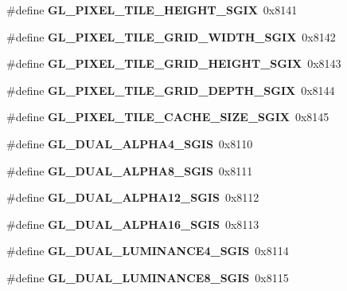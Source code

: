 \begin{DoxyCompactItemize}
\item 
\#define {\bfseries G\+L\+\_\+\+P\+I\+X\+E\+L\+\_\+\+T\+I\+L\+E\+\_\+\+H\+E\+I\+G\+H\+T\+\_\+\+S\+G\+I\+X}~0x8141\label{_s_d_l__opengl_8h_a1d4d01f0f5b2a302591bc7cd65da7f7f}

\item 
\#define {\bfseries G\+L\+\_\+\+P\+I\+X\+E\+L\+\_\+\+T\+I\+L\+E\+\_\+\+G\+R\+I\+D\+\_\+\+W\+I\+D\+T\+H\+\_\+\+S\+G\+I\+X}~0x8142\label{_s_d_l__opengl_8h_a966620eccb0139b2533f6ec094e22c11}

\item 
\#define {\bfseries G\+L\+\_\+\+P\+I\+X\+E\+L\+\_\+\+T\+I\+L\+E\+\_\+\+G\+R\+I\+D\+\_\+\+H\+E\+I\+G\+H\+T\+\_\+\+S\+G\+I\+X}~0x8143\label{_s_d_l__opengl_8h_aea9eb5632d5e562731dece8dda027c8f}

\item 
\#define {\bfseries G\+L\+\_\+\+P\+I\+X\+E\+L\+\_\+\+T\+I\+L\+E\+\_\+\+G\+R\+I\+D\+\_\+\+D\+E\+P\+T\+H\+\_\+\+S\+G\+I\+X}~0x8144\label{_s_d_l__opengl_8h_a31d3f2fd15ceb68a0a5bc84606d7b48a}

\item 
\#define {\bfseries G\+L\+\_\+\+P\+I\+X\+E\+L\+\_\+\+T\+I\+L\+E\+\_\+\+C\+A\+C\+H\+E\+\_\+\+S\+I\+Z\+E\+\_\+\+S\+G\+I\+X}~0x8145\label{_s_d_l__opengl_8h_acd930ab818187241acb60696083909ea}

\item 
\#define {\bfseries G\+L\+\_\+\+D\+U\+A\+L\+\_\+\+A\+L\+P\+H\+A4\+\_\+\+S\+G\+I\+S}~0x8110\label{_s_d_l__opengl_8h_a0fcac5085d66a0e2c27299067d656cf7}

\item 
\#define {\bfseries G\+L\+\_\+\+D\+U\+A\+L\+\_\+\+A\+L\+P\+H\+A8\+\_\+\+S\+G\+I\+S}~0x8111\label{_s_d_l__opengl_8h_ab1aa1dadda52fc595da940aa0bf1eb5d}

\item 
\#define {\bfseries G\+L\+\_\+\+D\+U\+A\+L\+\_\+\+A\+L\+P\+H\+A12\+\_\+\+S\+G\+I\+S}~0x8112\label{_s_d_l__opengl_8h_ae72536e212ead85a200058dd1b5fac52}

\item 
\#define {\bfseries G\+L\+\_\+\+D\+U\+A\+L\+\_\+\+A\+L\+P\+H\+A16\+\_\+\+S\+G\+I\+S}~0x8113\label{_s_d_l__opengl_8h_a19c90d06610d9701abb5b0a95a3a0daa}

\item 
\#define {\bfseries G\+L\+\_\+\+D\+U\+A\+L\+\_\+\+L\+U\+M\+I\+N\+A\+N\+C\+E4\+\_\+\+S\+G\+I\+S}~0x8114\label{_s_d_l__opengl_8h_a7e65d99b38671d3a2ff1fa1e8d917c08}

\item 
\#define {\bfseries G\+L\+\_\+\+D\+U\+A\+L\+\_\+\+L\+U\+M\+I\+N\+A\+N\+C\+E8\+\_\+\+S\+G\+I\+S}~0x8115\label{_s_d_l__opengl_8h_a80fbaabf2e74fd6106c285fb3e3220d2}


\end{DoxyCompactItemize}
